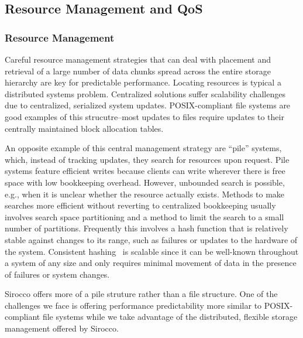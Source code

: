 \subsection{Resource Management and QoS}
\label{sec:qos}

\subsubsection{Resource Management}
Careful resource management strategies that can deal with placement and
retrieval of a large number of data chunks spread across the entire storage
hierarchy are key for predictable performance. 
Locating resources is typical a distributed systems problem. Centralized
solutions suffer scalability challenges due to centralized, serialized system
updates.  POSIX-compliant file systems are good examples of this
strucutre--most updates to files require updates to their centrally maintained
block allocation tables.

An opposite example of this central management strategy are ``pile'' systems,
which, instead of tracking updates, they search for resources upon request.
Pile systems feature efficient writes because clients can write wherever there
is free space with low bookkeeping overhead.  However, unbounded search is
possible, e.g., when it is unclear whether the resource actually exists.
Methods to make searches more efficient without reverting to centralized
bookkeeping usually involves search space partitioning and a method to limit
the search to a small number of partitions.  Frequently this involves a
hash function that is relatively stable against changes to its range, such as
failures or updates to the hardware of the system. Consistent
hashing~\cite{karger:stoc97} is scalable since it can be well-known throughout
a system of any size and only requires minimal movement of data in the presence
of failures or system changes. 

Sirocco offers more of a pile struture rather than a file structure. One of the
challenges we face is offering performance predictability more similar to
POSIX-compliant file systems while we take advantage of the distributed,
flexible storage management offered by Sirocco.

